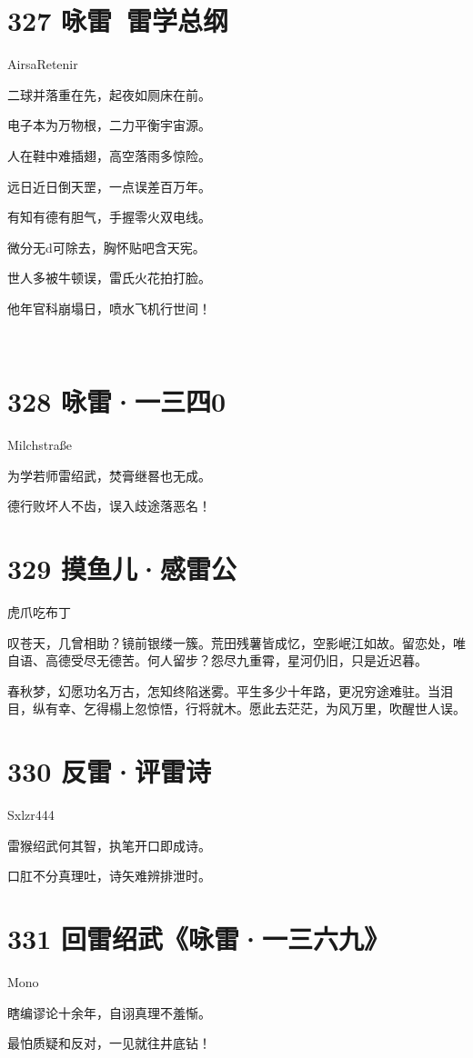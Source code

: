 \documentclass[UTF8,12pt,oneside]{ctexbook}
\def\pau#1{\begin{center} {#1} \end{center}} %
\def\poem#1#2{\section{#1}\pau{#2}} %
\begin{document}
        \poem{327 咏雷\ 雷学总纲}{AirsaRetenir}
        \begin{center}
            二球并落重在先，起夜如厕床在前。
            
            电子本为万物根，二力平衡宇宙源。
            
            人在鞋中难插翅，高空落雨多惊险。
            
            远日近日倒天罡，一点误差百万年。
            
            有知有德有胆气，手握零火双电线。
            
            微分无d可除去，胸怀贴吧含天宪。
            
            世人多被牛顿误，雷氏火花拍打脸。
            
            他年官科崩塌日，喷水飞机行世间！

            ~\\
        \end{center}

        \poem{328 咏雷·一三四0}{Milchstraße}
        \begin{center}
            为学若师雷绍武，焚膏继晷也无成。

            德行败坏人不齿，误入歧途落恶名！
        \end{center}

        \newpage

        \poem{329 摸鱼儿·感雷公}{虎爪吃布丁}
        
        叹苍天，几曾相助？镜前银缕一簇。荒田残薯皆成忆，空影岷江如故。留恋处，唯自语、高德受尽无德苦。何人留步？怨尽九重霄，星河仍旧，只是近迟暮。

        春秋梦，幻愿功名万古，怎知终陷迷雾。平生多少十年路，更况穷途难驻。当泪目，纵有幸、乞得榻上忽惊悟，行将就木。愿此去茫茫，为风万里，吹醒世人误。

        \poem{330 反雷·评雷诗}{Sxlzr444}
        \begin{center}
            雷猴绍武何其智，执笔开口即成诗。
            
            口肛不分真理吐，诗矢难辨排泄时。
        \end{center}

        \poem{331 回雷绍武《咏雷·一三六九》}{Mono}
        \begin{center}
            瞎编谬论十余年，自诩真理不羞惭。
            
            最怕质疑和反对，一见就往井底钻！
        \end{center}
\end{document}
